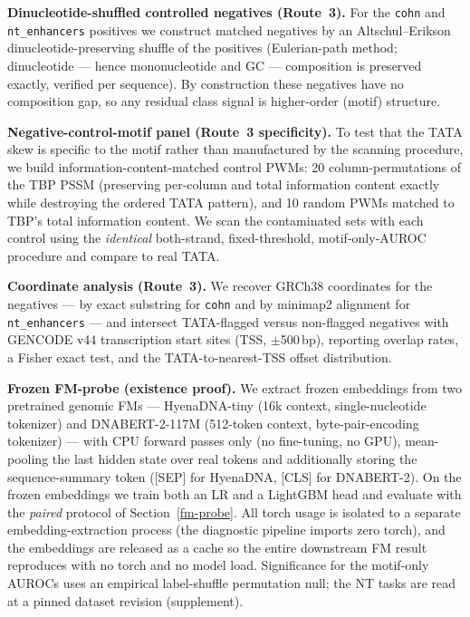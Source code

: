 \documentclass{ws-procs11x85}
\begin{document}
\textbf{Dinucleotide-shuffled controlled negatives (Route~3).} For the \texttt{cohn} and
\texttt{nt\_enhancers} positives we construct matched negatives by an Altschul--Erikson
dinucleotide-preserving shuffle\cite{altschul} of the positives (Eulerian-path method; dinucleotide ---
hence mononucleotide and GC --- composition is preserved exactly, verified per sequence). By construction
these negatives have no composition gap, so any residual class signal is higher-order (motif) structure.

\textbf{Negative-control-motif panel (Route~3 specificity).} To test that the TATA skew is specific to the
motif rather than manufactured by the scanning procedure, we build information-content-matched control
PWMs: 20 column-permutations of the TBP PSSM (preserving per-column and total information content exactly
while destroying the ordered TATA pattern), and 10 random PWMs matched to TBP's total information content.
We scan the contaminated sets with each control using the \emph{identical} both-strand, fixed-threshold,
motif-only-AUROC procedure and compare to real TATA.

\textbf{Coordinate analysis (Route~3).} We recover GRCh38 coordinates for the negatives --- by exact
substring for \texttt{cohn} and by minimap2 alignment\cite{minimap2} for \texttt{nt\_enhancers} --- and
intersect TATA-flagged versus non-flagged negatives with GENCODE v44 transcription start sites (TSS,
$\pm$500\,bp), reporting overlap rates, a Fisher exact test, and the TATA-to-nearest-TSS offset
distribution.

\textbf{Frozen FM-probe (existence proof).}\label{fm-probe-method} We extract frozen embeddings from two
pretrained genomic FMs --- HyenaDNA-tiny (16k context, single-nucleotide tokenizer) and DNABERT-2-117M
(512-token context, byte-pair-encoding tokenizer) --- with CPU forward passes only (no fine-tuning, no
GPU), mean-pooling the last hidden state over real tokens and additionally storing the sequence-summary
token ([SEP] for HyenaDNA, [CLS] for DNABERT-2). On the frozen embeddings we train both an LR and a
LightGBM head and evaluate with the \emph{paired} protocol of Section~\ref{fm-probe}. All torch usage is
isolated to a separate embedding-extraction process (the diagnostic pipeline imports zero torch), and the
embeddings are released as a cache so the entire downstream FM result reproduces with no torch and no
model load. Significance for the motif-only AUROCs uses an empirical label-shuffle permutation null; the
NT tasks are read at a pinned dataset revision (supplement).
\end{document}
